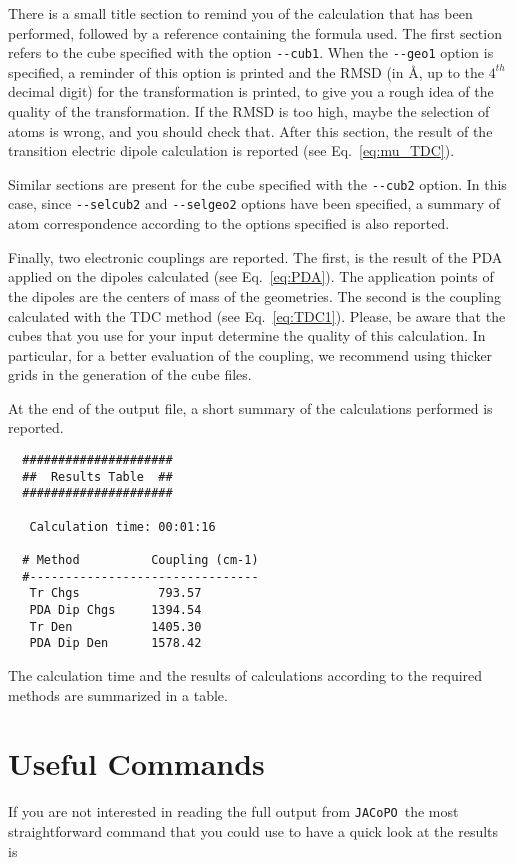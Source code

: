 \documentclass[a4paper]{article}
\newcommand{\jacopo}{\texttt{JACoPO}}
\begin{document}
There is a small title section to remind you of the calculation that has been performed, followed by a reference containing the formula used. The first section refers to the cube specified with the option \verb|--cub1|. When the \verb|--geo1| option is specified, a reminder of this option is printed and the RMSD (in \AA{}, up to the $4^{th}$ decimal digit) for the transformation is printed, to give you a rough idea of the quality of the transformation. If the RMSD is too high, maybe the selection of atoms is wrong, and you should check that.
After this section, the result of the transition electric dipole calculation is reported (see Eq.~\ref{eq:mu_TDC}).

Similar sections are present for the cube specified with the \verb|--cub2| option. In this case, since \verb|--selcub2| and \verb|--selgeo2| options have been specified, a summary of atom correspondence according to the options specified is also reported.

Finally, two electronic couplings are reported. The first, is the result of the PDA applied on the dipoles calculated (see Eq.~\ref{eq:PDA}). The application points of the dipoles are the centers of mass of the geometries. The second is the coupling calculated with the TDC method (see Eq.~\ref{eq:TDC1}).
Please, be aware that the cubes that you use for your input determine the quality of this calculation. In particular, for a better evaluation of the coupling, we recommend using thicker grids in the generation of the cube files.

At the end of the output file, a short summary of the calculations performed is reported.

\begin{verbatim}
  #####################
  ##  Results Table  ##
  #####################
  
   Calculation time: 00:01:16
  
  # Method          Coupling (cm-1)
  #--------------------------------
   Tr Chgs           793.57 
   PDA Dip Chgs     1394.54 
   Tr Den           1405.30 
   PDA Dip Den      1578.42 
\end{verbatim}

The calculation time and the results of calculations according to the required methods are summarized in a table.

\section*{Useful Commands}
If you are not interested in reading the full output from \jacopo\, the most straightforward command that you could use to have a quick look at the results is
\end{document}
